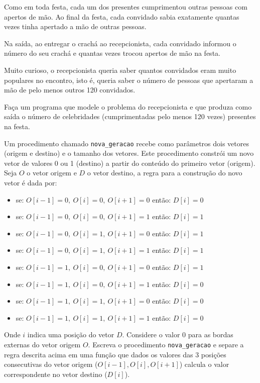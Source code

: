 Como em toda festa, cada um dos presentes cumprimentou outras pessoas
com apertos de mão. Ao final da festa, cada convidado sabia exatamente
quantas vezes tinha apertado a mão de outras pessoas.

Na saída, ao entregar o crachá ao recepcionista, cada convidado
informou o número do seu crachá e quantas vezes trocou apertos de mão
na festa.

Muito curioso, o recepcionista queria saber quantos convidados eram
muito populares no encontro, isto é, queria saber o número de pessoas
que apertaram a mão de pelo menos outros 120 convidados.

Faça um programa
que modele o problema do recepcionista e que produza como saída o
número de celebridades (cumprimentadas pelo menos 120 vezes) presentes
na festa.

\item Um procedimento chamado \texttt{nova\_geracao} 
recebe como parâmetros dois  vetores (origem e  destino) e o
tamanho  dos vetores.  Este  procedimento constrói  um  novo vetor  de
valores  0 ou  1  (destino) a  partir  do conteúdo  do primeiro  vetor
(origem). Seja $O$ o vetor origem e $D$ o vetor destino, a regra para 
a construção do novo vetor é dada por:
\begin{itemize}
\item 
se: $O[i-1] = 0,\ O[i] = 0,\ O[i+1] = 0$ então: $D[i] = 0$
\item 
se: $O[i-1] = 0,\ O[i] = 0,\ O[i+1] = 1$ então: $D[i] = 1$
\item 
se: $O[i-1] = 0,\ O[i] = 1,\ O[i+1] = 0$ então: $D[i] = 1$
\item 
se: $O[i-1] = 0,\ O[i] = 1,\ O[i+1] = 1$ então: $D[i] = 1$
\item 
se: $O[i-1] = 1,\ O[i] = 0,\ O[i+1] = 0$ então: $D[i] = 1$
\item 
se: $O[i-1] = 1,\ O[i] = 0,\ O[i+1] = 1$ então: $D[i] = 0$
\item 
se: $O[i-1] = 1,\ O[i] = 1,\ O[i+1] = 0$ então: $D[i] = 0$
\item 
se: $O[i-1] = 1,\ O[i] = 1,\ O[i+1] = 1$ então: $D[i] = 0$
\end{itemize}
Onde $i$ indica uma posição do vetor $D$. Considere o valor 0 para as
bordas externas do vetor origem $O$. Escreva o procedimento
\texttt{nova\_geracao} e separe a regra descrita acima em uma função
que dados os valores das 3 posições consecutivas do vetor origem
($O[i-1], O[i], O[i+1]$) calcula o valor correspondente no vetor
destino ($D[i]$).

